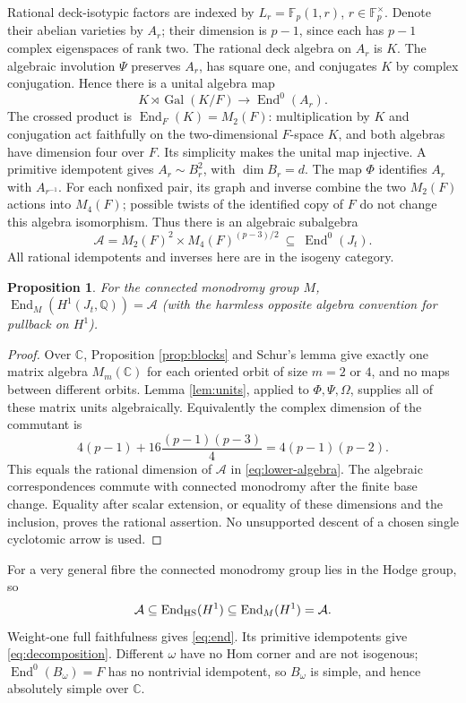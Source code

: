 \documentclass[11pt]{article}
\newtheorem{proposition}[theorem]{Proposition}
\theoremstyle{remark}
\newcommand{\Q}{\mathbb Q}
\newcommand{\F}{\mathbb F}
\newcommand{\C}{\mathbb C}
\newcommand{\End}{\operatorname{End}}
\newcommand{\Gal}{\operatorname{Gal}}
\begin{document}
Rational deck-isotypic factors are indexed by
\(L_r=\F_p(1,r)\), \(r\in\F_p^\times\).  Denote their abelian
varieties by \(A_r\); their dimension is \(p-1\), since each has
\(p-1\) complex eigenspaces of rank two.  The rational deck algebra
on \(A_r\) is \(K\).  The algebraic involution \(\Psi\) preserves
\(A_r\), has square one, and conjugates \(K\) by complex conjugation.
Hence there is a unital algebra map
\[
 K\rtimes\Gal(K/F)\longrightarrow\End^0(A_r).
\]
The crossed product is \(\End_F(K)=M_2(F)\): multiplication by
\(K\) and conjugation act faithfully on the two-dimensional
\(F\)-space \(K\), and both algebras have dimension four over \(F\).
Its simplicity makes the unital map injective.  A primitive idempotent
gives \(A_r\sim B_r^2\), with \(\dim B_r=d\).
The map \(\Phi\) identifies \(A_r\) with \(A_{r^{-1}}\).
For each nonfixed pair, its graph and inverse combine the two
\(M_2(F)\) actions into \(M_4(F)\); possible twists of the identified
copy of \(F\) do not change this algebra isomorphism.
Thus there is an algebraic subalgebra
\begin{equation}\label{eq:lower-algebra}
 \mathcal A=M_2(F)^2\times M_4(F)^{(p-3)/2}
       \ \subseteq\ \End^0(J_t).
\end{equation}
All rational idempotents and inverses here are in the isogeny category.

\begin{proposition}\label{prop:commutant}
For the connected monodromy group \(M\),
\(\End_M(H^1(J_t,\Q))=\mathcal A\) (with the harmless opposite
algebra convention for pullback on \(H^1\)).
\end{proposition}
\begin{proof}
Over \(\C\), Proposition \ref{prop:blocks} and Schur's lemma give
exactly one matrix algebra \(M_m(\C)\) for each oriented orbit of
size \(m=2\) or \(4\), and no maps between different orbits.
Lemma \ref{lem:units}, applied to \(\Phi,\Psi,\Omega\), supplies all
of these matrix units algebraically.  Equivalently the complex
dimension of the commutant is
\[
 4(p-1)+16\frac{(p-1)(p-3)}4=4(p-1)(p-2).
\]
This equals the rational dimension of \(\mathcal A\) in
\eqref{eq:lower-algebra}.  The algebraic correspondences commute
with connected monodromy after the finite base change.  Equality
after scalar extension, or equality of these dimensions and the
inclusion, proves the rational assertion.  No unsupported
descent of a chosen single cyclotomic arrow is used.
\end{proof}

For a very general fibre the connected monodromy group lies in the
Hodge group, so
\[
 \mathcal A\subseteq\End_{\rm HS}(H^1)
       \subseteq\End_M(H^1)=\mathcal A.
\]
Weight-one full faithfulness gives \eqref{eq:end}.
Its primitive idempotents give \eqref{eq:decomposition}.
Different \(\omega\) have no Hom corner and are not isogenous;
\(\End^0(B_\omega)=F\) has no nontrivial idempotent, so \(B_\omega\)
is simple, and hence absolutely simple over \(\C\).
\end{document}
